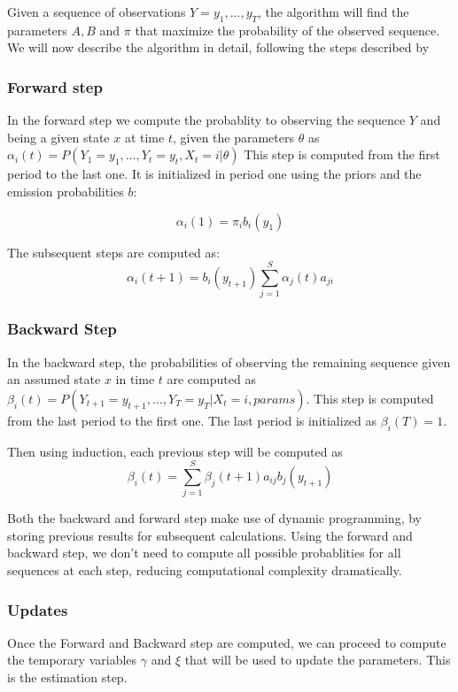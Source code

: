\documentclass[12pt, authoryear]{elsarticle}
\begin{document}
Given a sequence of observations $Y = {y_{1},...,y_{T}}$, the algorithm will find the parameters $ A, B$ and $\pi$ that maximize the probability of the observed sequence. We will now describe the algorithm in detail, following the steps described by \cite{rabiner1989tutorial}

\subsubsection{Forward step}

In the forward step we compute the probablity to observing the sequence $Y$ and being a given state $x$ at time $t$, given the parameters $\theta$ as $\alpha_{i}(t)=P\left(Y_{1}=y_{1}, \ldots, Y_{t}=y_{t}, X_{t}=i |\theta \right)$ This step is computed from the first period to the last one. It is initialized in period one using the priors and the emission probabilities $b$:

$$  \alpha_{i}(1)=\pi_{i} b_{i}\left(y_{1}\right) $$

The subsequent steps are computed as:
$$  \alpha_{i}(t+1)=b_{i}\left(y_{t+1}\right) \sum_{j=1}^{S} \alpha_{j}(t) a_{j i} $$

\subsubsection{Backward Step}

In the backward step, the probabilities of observing the remaining sequence given an assumed state $x$ in time $t$ are computed as $\beta_{i}(t)=P\left(Y_{t+1}=y_{t+1}, \ldots, Y_{T}=y_{T} | X_{t}=i, params\right)$. This step is computed from the last period to the first one. The last period is initialized as $\beta_{i}(T)=1$.

Then using induction, each previous step will be computed as 
$$ 
\beta_{i}(t)=\sum_{j=1}^{S} \beta_{j}(t+1) a_{i j} b_{j}\left(y_{t+1}\right)
$$

Both the backward and forward step make use of dynamic programming, by storing previous results for subsequent calculations. Using the forward and backward step, we don't need to compute all possible probablities for all sequences at each step, reducing computational complexity dramatically.

\subsubsection{Updates}
Once the Forward and Backward step are computed, we can proceed to compute the temporary variables $\gamma$ and $\xi$ that will be used to update the parameters. This is the estimation step.
\end{document}
